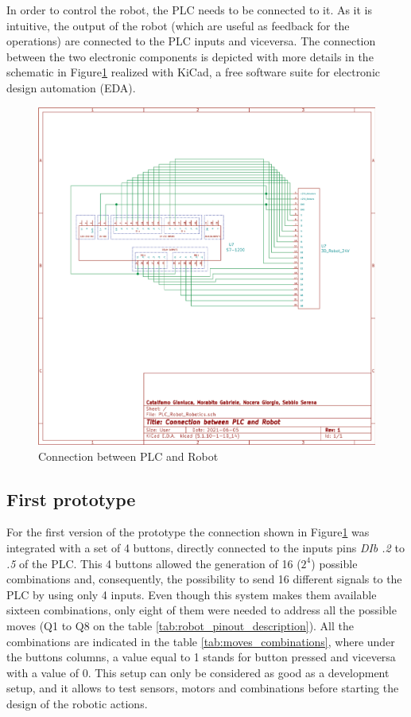 In order to control the robot, the PLC needs to be connected to it. As it is intuitive, the output of the robot (which are useful as feedback for the operations) are connected to the PLC inputs and viceversa. The connection between the two electronic components is depicted with more details in the schematic in Figure\ref{fig:plc_robot_connection} realized with KiCad, a free software suite for electronic design automation (EDA).

\begin{figure}[!h]
\begin{center}
\includegraphics[width=0.8\linewidth]{capitolo3/figure/plc_robot_connection}
\caption{Connection between PLC and Robot}
\label{fig:plc_robot_connection}
\end{center}
\end{figure}

\subsection{First prototype}
For the first version of the prototype the connection shown in Figure\ref{fig:plc_robot_connection} was integrated with a set of 4 buttons, directly connected to the inputs pins \textit{DIb .2} to \textit{.5} of the PLC. This 4 buttons allowed the generation of 16 ($2^4$) possible combinations and, consequently, the possibility to send 16 different signals to the PLC by using only 4 inputs. Even though this system makes them available sixteen combinations, only eight of them were needed to address all the possible moves (Q1 to Q8 on the table \ref{tab:robot_pinout_description}). All the combinations are indicated in the table \ref{tab:moves_combinations}, where under the buttons columns, a value equal to 1 stands for button pressed and viceversa with a value of 0. 
This setup can only be considered as good as a development setup, and it allows to test sensors, motors and combinations before starting the design of the robotic actions.

